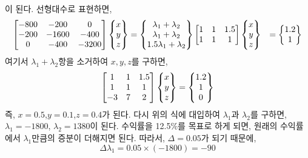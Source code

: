 \documentclass[a4,10pt]{article}
\theoremstyle{examplestyle}
\let\\\tabularnewline
\let\\\tabularnewline
\begin{document}
이 된다. 선형대수로 표현하면,
\begin{align*}
\begin{bmatrix}-800&-200&0\\-200&-1600&-400\\0&-400&-3200\end{bmatrix}\begin{Bmatrix}x\\y\\z\end{Bmatrix}&=\begin{Bmatrix}\lambda_{1}+\lambda_{2}\\\lambda_{1}+\lambda_{2}\\1.5\lambda_{1}+\lambda_{2}\end{Bmatrix}\\
\begin{bmatrix}1&1&1.5\\1&1&1\end{bmatrix}\begin{Bmatrix}x\\y\\z\end{Bmatrix}&=\begin{Bmatrix}1.2\\1\end{Bmatrix}
\end{align*}
여기서 $\lambda_{1}+\lambda_{2}$항을 소거하여 $x,y,z$를 구하면,
\begin{equation*}
\begin{bmatrix}1&1&1.5\\1&1&1\\-3&7&2\end{bmatrix}\begin{Bmatrix}x\\y\\z\end{Bmatrix}=\begin{Bmatrix}1.2\\1\\0\end{Bmatrix}
\end{equation*}
즉, $x=0.5$,$y=0.1$,$z=0.4$가 된다. 다시 위의 식에 대입하여 $\lambda_{1}$과 $\lambda_{2}$를 구하면, $\lambda_{1}=-1800$, $\lambda_{2}=1380$이 된다. 수익률을 12.5\%를 목표로 하게 되면, 원래의 수익률에서 $\lambda_{1}$만큼의 증분이 더해지면 된다. 따라서, $\Delta=0.05$가 되기 때문에,
\begin{equation*}
\Delta\lambda_{1}=0.05\times(-1800)=-90
\end{equation*}
\end{document}
